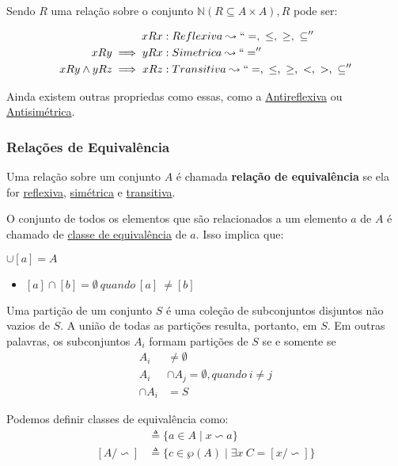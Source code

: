\documentclass[12pt, a4paper]{article}
\begin{document}
Sendo $R$ uma relação sobre o conjunto $\mathbb{N} (R \subseteq A \times A), R$ pode ser:

\begin{align*}
x R x &: Reflexiva \leadsto `` =, ~\leq, ~\geq, ~\subseteq ''\\
x R y \implies  y R x  &: Simetrica \leadsto `` =  ''\\
x R y \land y R z \implies x R z &: Transitiva \leadsto  `` =, ~\leq, ~\geq, ~<, ~>, ~\subseteq ''
\end{align*}

Ainda existem outras propriedas como essas, como a \underline{Antireflexiva} ou \underline{Antisimétrica}.

\subsubsection{Relações de Equivalência}
Uma relação sobre um conjunto $A$ é chamada \textbf{relação de equivalência} se ela for \underline{reflexiva},
\underline{simétrica} e \underline{transitiva}.

O conjunto de todos os elementos que são relacionados a um elemento $a$ de $A$ é chamado de \underline{classe de equivalência} de $a$. Isso implica que:
\begin{center}
$\cup [a] = A$
\end{center}

\begin{itemize}
\item $[a] \cap [b] = \emptyset ~quando~ [a]~ \neq[b]$\\
\end{itemize}

Uma partição de um conjunto $S$ é uma coleção de subconjuntos disjuntos não vazios de $S$. A união de todas as partições resulta, portanto, em $S$. Em outras palavras, os subconjuntos $A_i$ formam partições de $S$ se e somente se\\
\begin{align*}
A_i &\neq \emptyset\\
A_i &\cap A_j = \emptyset, quando~i \neq j\\
\cap A_i &= S
\end{align*}

Podemos definir classes de equivalência como:\\
\begin{align*}
[x/\backsim] &\triangleq \{a \in A \mid x \backsim a \}\\
[A/\backsim] &\triangleq \{c \in \wp(A) \mid \exists x ~ C = [x/\backsim] \}
\end{align*}
\end{document}
